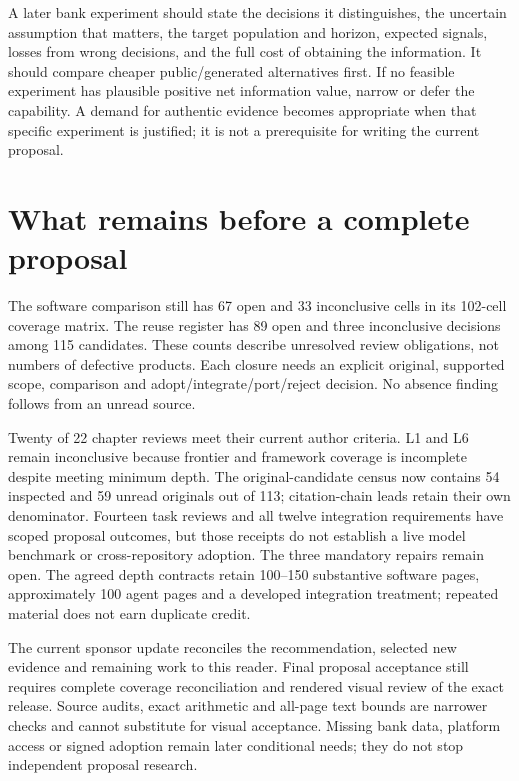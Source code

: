 A later bank experiment should state the decisions it distinguishes, the
uncertain assumption that matters, the target population and horizon,
expected signals, losses from wrong decisions, and the full cost of
obtaining the information. It should compare cheaper public/generated
alternatives first. If no feasible experiment has plausible positive net
information value, narrow or defer the capability. A demand for
authentic evidence becomes appropriate when that specific experiment is
justified; it is not a prerequisite for writing the current proposal.

\hypertarget{what-remains-before-a-complete-proposal}{%
\section{What remains before a complete
proposal}\label{what-remains-before-a-complete-proposal}}

The software comparison still has 67 open and 33 inconclusive cells in
its 102-cell coverage matrix. The reuse register has 89 open and three
inconclusive decisions among 115 candidates. These counts describe
unresolved review obligations, not numbers of defective products. Each
closure needs an explicit original, supported scope, comparison and
adopt/integrate/port/reject decision. No absence finding follows from an
unread source.
\citep{sp20md_progress,sp20gf_progress,sp20hy_progress,sp20je_progress,sp20nc_progress,sp20gc_progress,sp20ea_progress,sp20vm_progress,sp20pye_progress,sp20fx_progress,sp20pa_progress,sp20rfx_progress}

Twenty of 22 chapter reviews meet their current author criteria. L1 and
L6 remain inconclusive because frontier and framework coverage is
incomplete despite meeting minimum depth. The original-candidate census
now contains 54 inspected and 59 unread originals out of 113;
citation-chain leads retain their own denominator. Fourteen task reviews
and all twelve integration requirements have scoped proposal outcomes,
but those receipts do not establish a live model benchmark or
cross-repository adoption. The three mandatory repairs remain open. The
agreed depth contracts retain 100--150 substantive software pages,
approximately 100 agent pages and a developed integration treatment;
repeated material does not earn duplicate credit.
\citep{sp20md_progress,sp19ec_census,sp18ar_census,sp18f_census,sp13_scope}

The current sponsor update reconciles the recommendation, selected new
evidence and remaining work to this reader. Final proposal acceptance
still requires complete coverage reconciliation and rendered visual
review of the exact release. Source audits, exact arithmetic and
all-page text bounds are narrower checks and cannot substitute for
visual acceptance. Missing bank data, platform access or signed adoption
remain later conditional needs; they do not stop independent proposal
research. \citep{sp20md_reader,sp20md_progress}

